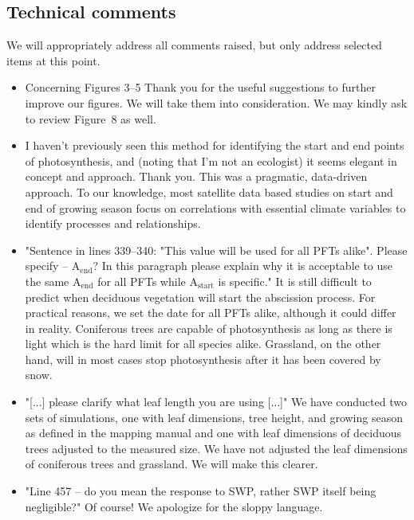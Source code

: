 \documentclass{scrartcl}
\begin{document}
\subsection*{Technical comments}
We will appropriately address all comments raised, but only address selected items at this point.
\begin{itemize}
    \item {\color{blue} Concerning Figures 3--5} Thank you for the useful suggestions to further improve our figures. We will take them into consideration. We may kindly ask to review Figure~8 as well.
    \item {\color{blue} I haven't previously seen this method for identifying the start and end points of photosynthesis, and (noting that I'm not an ecologist) it seems elegant in concept and approach.} Thank you. This was a pragmatic, data-driven approach. To our knowledge, most satellite data based studies on start and end of growing season focus on correlations with essential climate variables to identify processes and relationships.
    \item {\color{blue}"Sentence in lines 339--340: "This value will be used for all PFTs alike". Please specify -- $\mathrm{A_{end}}$? In this paragraph please explain why it is acceptable to use the same $\mathrm{A_{end}}$ for all PFTs while $\mathrm{A_{start}}$ is specific."} It is still difficult to predict when deciduous vegetation will start the abscission process. For practical reasons, we set the date for all PFTs alike, although it could differ in reality. Coniferous trees are capable of photosynthesis as long as there is light which is the hard limit for all species alike. Grassland, on the other hand, will in most cases stop photosynthesis after it has been covered by snow.
    \item {\color{blue} "[...] please clarify what leaf length you are using [...]"} We have conducted two sets of simulations, one with leaf dimensions, tree height, and growing season as defined in the mapping manual and one with leaf dimensions of deciduous trees adjusted to the measured size. We have not adjusted the leaf dimensions of coniferous trees and grassland. We will make this clearer.
    \item {\color{blue} "Line 457 -- do you mean the response to SWP, rather SWP itself being negligible?"} Of course! We apologize for the sloppy language.

\end{itemize}
\end{document}
